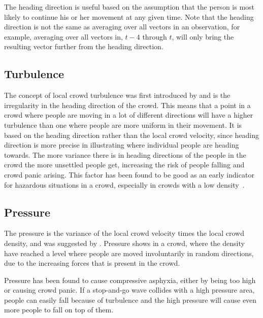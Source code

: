 The heading direction is useful based on the assumption that the person is most likely to continue his or her movement at any given time. Note that the heading direction is not the same as averaging over all vectors in an observation, for example, averaging over all vectors in, $t-4$ through $t$, will only bring the resulting vector further from the heading direction.

\subsection{Turbulence}
\label{sub:crowdFactorTurbulence}
The concept of local crowd turbulence was first introduced by \citet{videoanalysis} and is the irregularity in the heading direction of the crowd. This means that a point in a crowd where people are moving in a lot of different directions will have a higher turbulence than one where people are more uniform in their movement. It is based on the heading direction rather than the local crowd velocity, since heading direction is more precise in illustrating where individual people are heading towards. The more variance there is in heading directions of the people in the crowd the more unsettled people get, increasing the risk of people falling and crowd panic arising. This factor has been found to be good as an early indicator for hazardous situations in a crowd, especially in crowds with a low density~\cite{wirz2012inferring}.


\subsection{Pressure}
\label{subsec:crowdConditionsPressure}
The pressure is the variance of the local crowd velocity times the local crowd density, and was suggested by \citeauthor{empircalstudy} \citeyearpar{empircalstudy} \cite{empircalstudy}. Pressure shows in a crowd, where the density have reached a level where people are moved involuntarily in random directions, due to the increasing forces that is present in the crowd.

Pressure has been found to cause compressive asphyxia, either by being too high or causing crowd panic. If a stop-and-go wave collides with a high pressure area, people can easily fall because of turbulence and the high pressure will cause even more people to fall on top of them\cite{videoanalysis}.

